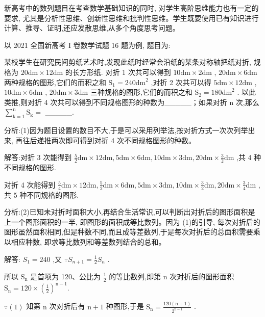 \documentclass[10pt]{article}
\begin{document}
新高考中的数列题目在考查数学基础知识的同时, 对学生高阶思维能力也有一定的要求, 尤其是分析性思维、创新性思维和批判性思维。学生既要使用已有知识进行计算、推导、证明,还应发散思维,从多个角度思考问题。

以 2021 全国新高考 I 卷数学试题 16 题为例, 题目为:

某校学生在研究民间剪纸艺术时,发现此纸时经常会沿纸的某条对称轴把纸对折, 规格为 \({20}\mathrm{{dm}} \times  {12}\mathrm{{dm}}\) 的长方形纸. 对折 1 次共可以得到 \({10}\mathrm{{dm}} \times  2\mathrm{{dm}}\) , \({20}\mathrm{{dm}} \times  6\mathrm{{dm}}\) 两种规格的图形,它们的而积之和 \({\mathrm{S}}_{1} = {240}{\mathrm{{dm}}}^{2}\) ,对折 2 次共可以得 \(5\mathrm{{dm}} \times  {12}\mathrm{{dm}}\) , \({10}\mathrm{{dm}} \times  6\mathrm{{dm}}\) , \({20}\mathrm{{dm}} \times  3\mathrm{{dm}}\) 三种规格的图形,它们的而积之和 \({\mathrm{S}}_{2} = {180}{\mathrm{{dm}}}^{2}\) . 以此类推,则对折 4 次共可以得到不同规格图形的种数为\_\_\_\_\_；如果对折 \(\mathrm{n}\) 次,那么 \(\mathop{\sum }\limits_{{\mathrm{k} = 1}}^{\mathrm{n}}{\mathrm{S}}_{\mathrm{k}} =\) \_\_\_\_\_.

分析:(1)因为题目设置的数目不大,于是可以采用列举法,按对折方式一次次列举出来, 再往后递推两次即可得到对折 4 次不同规格图形的种数。

解答:对折 3 次能得到 \(\frac{5}{2}\mathrm{{dm}} \times  {12}\mathrm{{dm}},5\mathrm{{dm}} \times  6\mathrm{{dm}},{10}\mathrm{{dm}} \times  3\mathrm{{dm}},{20}\mathrm{{dm}} \times  \frac{3}{2}\mathrm{{dm}}\) ,共 4 种不同规格的图形.

对折 4 次能得到 \(\frac{5}{4}\mathrm{{dm}} \times  {12}\mathrm{{dm}},\frac{5}{2}\mathrm{{dm}} \times  6\mathrm{{dm}},5\mathrm{{dm}} \times  3\mathrm{{dm}},{10}\mathrm{{dm}} \times  \frac{3}{2}\mathrm{{dm}},{20}\mathrm{{dm}} \times  \frac{3}{4}\mathrm{{dm}}\) , 共 5 种不同规格的图形.

分析:(2)已知未对折时面积大小,再结合生活常识,可以判断出对折后的图形面积是上一个图形面积的一半, 即图形的面积成等比数列。因为 (1)的引导, 每次对折后的图形虽然面积相同,但是种数不同,而且成等差数列,于是每次对折后的总面积需要乘以相应种数, 即求等比数列和等差数列结合的总和。

解答: \({S}_{1} = {240}\) ,又 \(\because {S}_{n + 1} = \frac{1}{2}{S}_{n}\) .

所以 \({\mathrm{S}}_{\mathrm{n}}\) 是首项为 120、公比为 \(\frac{1}{2}\) 的等比数列,即第 \(\mathrm{n}\) 次对折后的图形面积 \({\mathrm{S}}_{\mathrm{n}} = {120} \times  {\left( \frac{1}{2}\right) }^{\mathrm{n} - 1}.\)

\(\because \left( 1\right)\) 知第 \(\mathrm{n}\) 次对折后有 \(\mathrm{n} + 1\) 种图形,于是 \({\mathrm{S}}_{\mathrm{n}} = \frac{{120}\left( {\mathrm{n} + 1}\right) }{{2}^{\mathrm{n} - 1}}\) .
\end{document}
